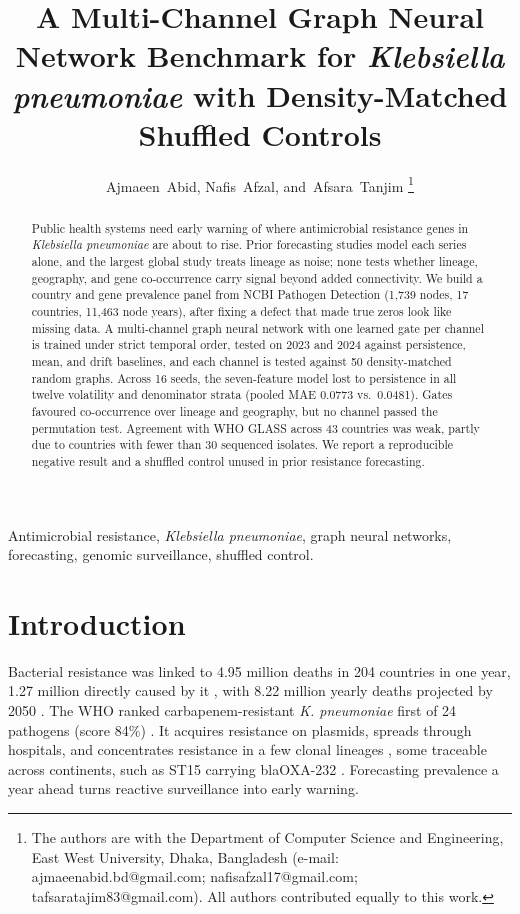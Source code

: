 \documentclass[journal]{IEEEtran}
\title{A Multi-Channel Graph Neural Network Benchmark for \textit{Klebsiella pneumoniae} with Density-Matched Shuffled Controls}
\author{Ajmaeen~Abid, Nafis~Afzal, and~Afsara~Tanjim
\thanks{The authors are with the Department of Computer Science and Engineering, East West University, Dhaka, Bangladesh (e-mail: ajmaeenabid.bd@gmail.com; nafisafzal17@gmail.com; tafsaratajim83@gmail.com). All authors contributed equally to this work.}}
\begin{document}
\maketitle

\begin{abstract}
Public health systems need early warning of where antimicrobial resistance genes in \textit{Klebsiella pneumoniae} are about to rise. Prior forecasting studies model each series alone, and the largest global study treats lineage as noise; none tests whether lineage, geography, and gene co-occurrence carry signal beyond added connectivity. We build a country and gene prevalence panel from NCBI Pathogen Detection (1,739 nodes, 17 countries, 11,463 node years), after fixing a defect that made true zeros look like missing data. A multi-channel graph neural network with one learned gate per channel is trained under strict temporal order, tested on 2023 and 2024 against persistence, mean, and drift baselines, and each channel is tested against 50 density-matched random graphs. Across 16 seeds, the seven-feature model lost to persistence in all twelve volatility and denominator strata (pooled MAE 0.0773 vs.\ 0.0481). Gates favoured co-occurrence over lineage and geography, but no channel passed the permutation test. Agreement with WHO GLASS across 43 countries was weak, partly due to countries with fewer than 30 sequenced isolates. We report a reproducible negative result and a shuffled control unused in prior resistance forecasting.
\end{abstract}

\begin{IEEEkeywords}
Antimicrobial resistance, \textit{Klebsiella pneumoniae}, graph neural networks, forecasting, genomic surveillance, shuffled control.
\end{IEEEkeywords}

\section{Introduction}
Bacterial resistance was linked to 4.95 million deaths in 204 countries in one year, 1.27 million directly caused by it \cite{ref1}, with 8.22 million yearly deaths projected by 2050 \cite{ref2}. The WHO ranked carbapenem-resistant \textit{K. pneumoniae} first of 24 pathogens (score 84\%) \cite{ref3}. It acquires resistance on plasmids, spreads through hospitals, and concentrates resistance in a few clonal lineages \cite{ref9, ref12}, some traceable across continents, such as ST15 carrying blaOXA-232 \cite{ref11}. Forecasting prevalence a year ahead turns reactive surveillance into early warning.
\end{document}

